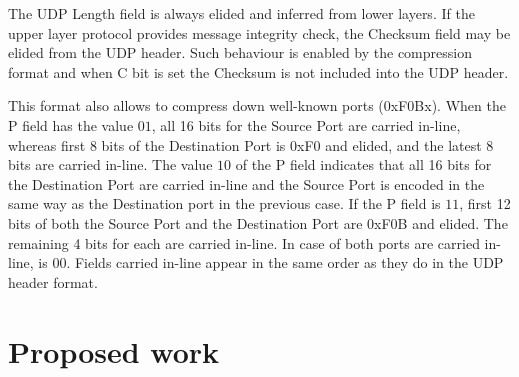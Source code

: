 \documentclass[12pt, titlepage, a4paper]{report}
\begin{document}
The UDP Length field is always elided and inferred from lower layers. If the upper layer protocol provides message integrity check, the Checksum field may be elided from the UDP header. Such behaviour is enabled by the compression format and when C bit is set the Checksum is not included into the UDP header.

This format also allows to compress down well-known ports (0xF0Bx).	When the P field has the value $01$, all 16 bits for the Source Port are carried in-line, whereas first 8 bits of the Destination Port is 0xF0 and elided, and the latest 8 bits are carried in-line. The value $10$ of the P field indicates that all 16 bits for the Destination Port are carried in-line and the Source Port is encoded in the same way as the Destination port in the previous case. If the P field is $11$, first 12 bits of both the Source Port and the Destination Port are 0xF0B and elided. The remaining 4 bits for each are carried in-line. In case of both ports are carried in-line, is $00$. Fields carried in-line appear in the same order as they do in the UDP header format.  




\chapter*{Proposed work}

\newpage



\nocite{ieee802.15.4} 
\nocite{eui64} 
\nocite{rfc780}
\nocite{rfc2460}
\nocite{rfc2464}
\nocite{rfc2474}
\nocite{rfc3168}
\nocite{rfc3775}
\nocite{rfc4191}
\nocite{rfc4291} 
\nocite{rfc4443}
\nocite{rfc4861}
\nocite{rfc4862}
\nocite{rfc4919}
\nocite{rfc4944} 
\nocite{draft-usecases-05} 
\nocite{draft-hc-06} 
\nocite{draft-nd-07}
\end{document}
